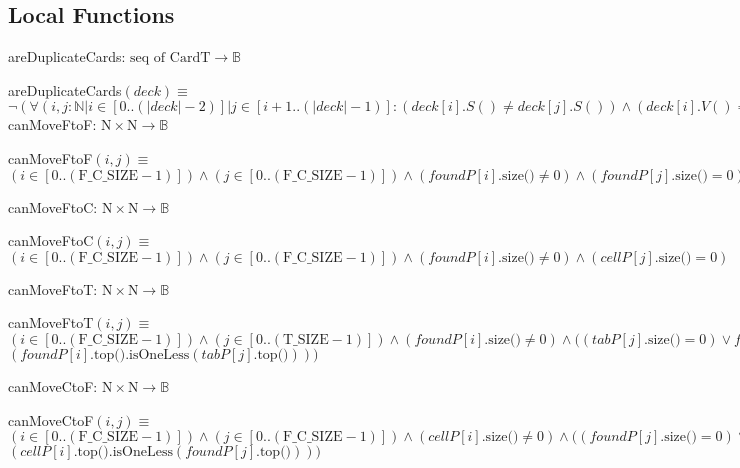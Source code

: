 \documentclass[12pt]{article}
\begin{document}
\subsection*{Local Functions}

areDuplicateCards: $\mbox{seq of CardT} \rightarrow \mbox{$\mathbb{B}$}$

\noindent areDuplicateCards$(deck) \equiv$
\medskip
$\lnot(\forall(i,j : \mathbb{N} | i \in [0..(|deck|-2)]|j \in [i+1..(|deck|-1)]: (deck[i].S() \not= deck[j].S()) \land (deck[i].V() \not= deck[j].V())))$\\

\noindent canMoveFtoF: $\mbox{N} \times \mbox{N} \rightarrow \mbox{$\mathbb{B}$}$

\noindent canMoveFtoF$(i,j) \equiv$
$(i \in [0..(\mbox{F\_C\_SIZE}-1)]) \land (j \in [0..(\mbox{F\_C\_SIZE}-1)]) \land (foundP[i].\mbox{size()} \not= 0) \land (foundP[j].\mbox{size()} = 0) \land (foundP[i].\mbox{top}().\mbox{V()} = ace) $\\
\medskip

\noindent canMoveFtoC: $\mbox{N} \times \mbox{N} \rightarrow \mbox{$\mathbb{B}$}$

\noindent canMoveFtoC$(i,j) \equiv$
$(i \in [0..(\mbox{F\_C\_SIZE}-1)]) \land (j \in [0..(\mbox{F\_C\_SIZE}-1)]) \land (foundP[i].\mbox{size()} \not= 0) \land (cellP[j].\mbox{size()} = 0) $\\
\medskip

\noindent canMoveFtoT: $\mbox{N} \times \mbox{N} \rightarrow \mbox{$\mathbb{B}$}$

\noindent canMoveFtoT$(i,j) \equiv$
$(i \in [0..(\mbox{F\_C\_SIZE}-1)]) \land (j \in [0..(\mbox{T\_SIZE}-1)]) \land (foundP[i].\mbox{size()} \not= 0) \land ((tabP[j].\mbox{size()} = 0) \lor foundP[i].\mbox{top()}.\mbox{isOppositeColour}(tabP[j].\mbox{top()}) \land$\\$ (foundP[i].\mbox{top()}.\mbox{isOneLess}(tabP[j].\mbox{top()}))) $\\
\medskip

\noindent canMoveCtoF: $\mbox{N} \times \mbox{N} \rightarrow \mbox{$\mathbb{B}$}$

\noindent canMoveCtoF$(i,j) \equiv$
$(i \in [0..(\mbox{F\_C\_SIZE}-1)]) \land (j \in [0..(\mbox{F\_C\_SIZE}-1)]) \land (cellP[i].\mbox{size()} \not= 0) \land ((foundP[j].\mbox{size()} = 0) \lor cellP[i].\mbox{top()}.\mbox{isOppositeColour}(foundP[j].\mbox{top()}) \land$\\$ (cellP[i].\mbox{top()}.\mbox{isOneLess}(foundP[j].\mbox{top()}))) $\\
\medskip
\end{document}
